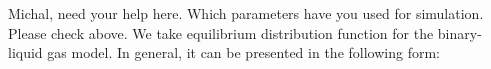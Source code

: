 \documentclass[mathpazo]{cicp}
\begin{document}
{\color{red} Michal, need your help here. Which parameters have you used for simulation. Please check above.}
We take equilibrium distribution function for the binary-liquid gas model. In general, it can be presented in the following form:




\end{document}
